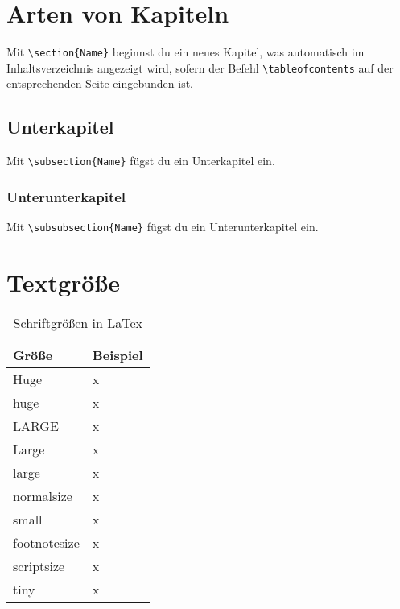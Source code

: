 \documentclass[12pt, a4paper]{article} %
\begin{document}
\section{Arten von Kapiteln}

Mit \verb|\section{Name}| beginnst du ein neues Kapitel, was automatisch im Inhaltsverzeichnis angezeigt wird, sofern der Befehl \verb|\tableofcontents| auf der entsprechenden Seite eingebunden ist.

\subsection{Unterkapitel}

Mit \verb|\subsection{Name}| f\"ugst du ein Unterkapitel ein.

\subsubsection{Unterunterkapitel}

Mit \verb|\subsubsection{Name}| f\"ugst du ein Unterunterkapitel ein.

\section{Textgr\"o\ss e}





\begin{table}[h] 
\centering
\begin{tabular}{l | l}
\bf{Gr\"o\ss e} & \bf{Beispiel} \\
\hline 
Huge & x\\
\hline
huge & x\\
\hline
LARGE & x\\
\hline
Large & x\\
\hline 
large & x\\
\hline
normalsize & x\\
\hline
small & x\\
\hline
footnotesize & x\\
\hline
scriptsize & x\\
\hline
tiny & x\\
\end{tabular}
\caption{\label{tab4}Schriftgr\"o\ss en in LaTex }
\end{table}
\end{document}
